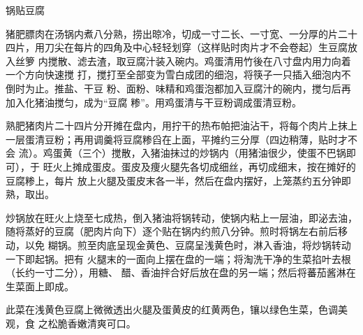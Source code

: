 \begin{recipe}{锅贴豆腐}

\ingredients


\preparation

\step 猪肥膘肉在汤锅内煮八分熟，捞出晾冷，切成一寸二长、一寸宽、一分厚的片二十
四片，用刀尖在每片的四角及中心轻轻划穿（这样贴时肉片才不会卷起）生豆腐放入丝箩
内搅散、滤去渣，取豆腐汁装入碗内。鸡蛋清用竹後在八寸盘内用力向着一个方向快速搅
打，搅打至全部变为雪白成团的细泡，将筷子一只插入细泡内不倒时为止。推盐、干豆
粉、面粉、味精和鸡蛋泡都加入豆腐汁的碗内，搅匀后再加入化猪油搅匀，成为“豆腐
糁”。用鸡蛋清与干豆粉调成蛋清豆粉。

\step 熟肥猪肉片二十四片分开摊在盘内，用拧干的热布帕把油沾干，将每个肉片上抹上
一层蛋清豆粉；再用调羹将豆腐糁舀在上面，平摊约三分厚（四边稍薄，贴时才不会
流）。鸡蛋黄（三个）搅散，入猪油抹过的炒锅内（用猪油很少，使蛋不巴锅即可），于
旺火上摊成蛋皮。蛋皮及痩火腿先各切成细丝，再切成细末，按在摊好的豆腐糁上，每片
放上火腿及蛋皮末各一半，然后在盘内摆好，上笼蒸约五分钟即熟，取出。

\step 炒锅放在旺火上烧至七成热，倒入猪油将锅转动，使锅内粘上一层油，即泌去油，
随将蒸好的豆腐（肥肉片向下）逐个贴在锅内约煎八分钟。煎时将锅左右前后移动，以免
糊锅。煎至肉底呈现金黄色、豆腐呈浅黄色时，淋入香油，将炒锅转动一下即起锅。把有
火腿末的一面向上摆在盘的一端；将淘洗干净的生菜掐叶去根（长约一寸二分），用糖、
醋、香油拌合好后放在盘的另一端；然后将蕃茄酱淋在生菜面上即成。

\features

此菜在浅黄色豆腐上微微透出火腿及蛋黄皮的红黄两色，镶以绿色生菜，色调美观，食
之松脆香嫩清爽可口。

\end{recipe}

